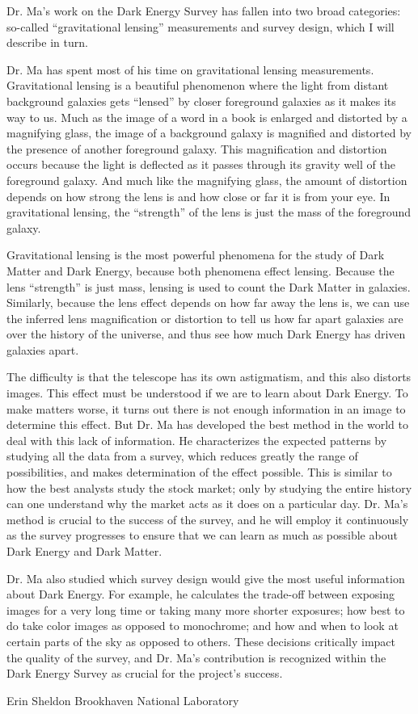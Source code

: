 \documentclass[12pt]{letter}
\begin{document}
Dr. Ma's work on the Dark Energy Survey has fallen into two broad categories:
so-called ``gravitational lensing'' measurements and survey design, which I
will describe in turn.  

Dr. Ma has spent most of his time on gravitational lensing measurements.
Gravitational lensing is a beautiful phenomenon where the light from distant
background galaxies gets ``lensed'' by closer foreground galaxies as it makes
its way to us.  Much as the image of a word in a book is enlarged and distorted
by a magnifying glass, the image of a background galaxy is magnified and
distorted by the presence of another foreground galaxy.  This magnification and
distortion occurs because the light is deflected as it passes through its
gravity well of the foreground galaxy.  And much like the magnifying glass, the
amount of distortion depends on how strong the lens is and how close or far it
is from your eye.  In gravitational lensing, the ``strength'' of the lens is
just the mass of the foreground galaxy.

Gravitational lensing is the most powerful phenomena for the study of Dark
Matter and Dark Energy, because both phenomena effect lensing.  Because the
lens ``strength'' is just mass, lensing is used to count the Dark Matter in
galaxies.  Similarly, because the lens effect depends on how far away the lens
is, we can use the inferred lens magnification or distortion to tell us how
far apart galaxies are over the history of the universe, and thus see how much
Dark Energy has driven galaxies apart.

The difficulty is that the telescope has its own astigmatism, and this also
distorts images.  This effect must be understood if we are to learn about Dark
Energy.  To make matters worse, it turns out there is not enough information in
an image to determine this effect.  But Dr. Ma has developed the best method in
the world to deal with this lack of information.  He characterizes the expected
patterns by studying all the data from a survey, which reduces greatly the
range of possibilities, and makes determination of the effect possible.  This
is similar to how the best analysts study the stock market; only by studying
the entire history can one understand why the market acts as it does on a
particular day.  Dr. Ma's method is crucial to the success of the survey, and
he will employ it continuously as the survey progresses to ensure that we can
learn as much as possible about Dark Energy and Dark Matter.

Dr. Ma also studied which survey design would give the most useful information
about Dark Energy.  For example, he calculates the trade-off between exposing
images for a very long time or taking many more shorter exposures; how best to
do take color images as opposed to monochrome; and how and when to look at
certain parts of the sky as opposed to others.  These decisions critically
impact the quality of the survey, and Dr. Ma's contribution is recognized
within the Dark Energy Survey as crucial for the project's success.


{\noindent Erin Sheldon}
\newline
{\noindent Brookhaven National Laboratory}
\end{document}
